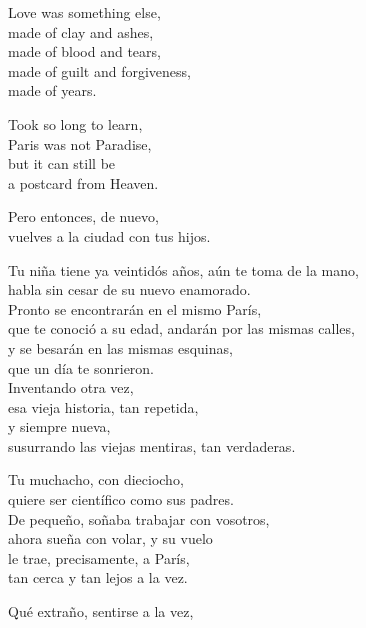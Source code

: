 \documentclass[12pt,twoside]{article}
\begin{document}
\begin{poem}
\begin{stanza}
Love was something else,\\
made of clay and ashes,\\
made of blood and tears,\\
made of guilt and forgiveness,\\
made of years.
\end{stanza}
\begin{stanza}
Took so long to learn,\\
Paris was not Paradise,\\
but it can still be\\
a postcard from Heaven.
\end{stanza}
\end{poem}

\begin{poem}
\begin{stanza}
Pero entonces, de nuevo,\\
vuelves a la ciudad con tus hijos.
\end{stanza}
\begin{stanza}
Tu niña tiene ya veintidós años, aún te toma de la mano,\\
habla sin cesar de su nuevo enamorado.\\
Pronto se encontrarán en el mismo París,\\
que te conoció a su edad, andarán por las mismas calles,\\
y se besarán en las mismas esquinas,\\
que un día te sonrieron.\\
Inventando otra vez,\\
esa vieja historia, tan repetida,\\
y siempre nueva,\\
susurrando las viejas mentiras, tan verdaderas.
\end{stanza}
\begin{stanza}
Tu muchacho, con dieciocho,\\
quiere ser científico como sus padres.\\
De pequeño, soñaba trabajar con vosotros,\\
ahora sueña con volar, y su vuelo\\
le trae, precisamente, a París,\\
tan cerca y tan lejos a la vez.
\end{stanza}
\begin{stanza}
Qué extraño, sentirse a la vez,\\

\end{stanza}
\end{poem}
\end{document}
